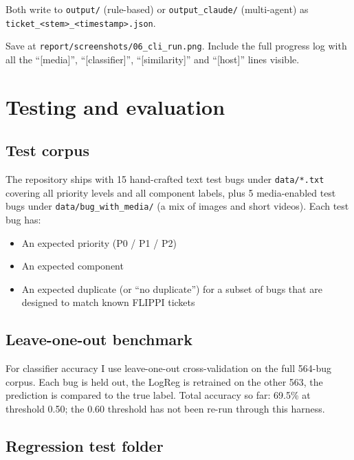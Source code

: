 \documentclass[11pt,a4paper]{article}
\begin{document}
Both write to \texttt{output/} (rule-based) or \texttt{output\_claude/}
(multi-agent) as \texttt{ticket\_<stem>\_<timestamp>.json}.

\begin{screenshotbox}
Save at \texttt{report/screenshots/06\_cli\_run.png}. Include the full
progress log with all the ``[media]'', ``[classifier]'', ``[similarity]''
and ``[host]'' lines visible.
\end{screenshotbox}

\newpage

\section{Testing and evaluation}

\subsection{Test corpus}

The repository ships with 15 hand-crafted text test bugs under
\texttt{data/*.txt} covering all priority levels and all component labels,
plus 5 media-enabled test bugs under \texttt{data/bug\_with\_media/} (a
mix of images and short videos). Each test bug has:

\begin{itemize}[leftmargin=1.4em,nosep]
\item An expected priority (P0 / P1 / P2)
\item An expected component
\item An expected duplicate (or ``no duplicate'') for a subset of bugs
      that are designed to match known FLIPPI tickets
\end{itemize}

\subsection{Leave-one-out benchmark}

For classifier accuracy I use leave-one-out cross-validation on the full
564-bug corpus. Each bug is held out, the LogReg is retrained on the
other 563, the prediction is compared to the true label. Total accuracy
so far: 69.5\% at threshold 0.50; the 0.60 threshold has not been re-run
through this harness.

\subsection{Regression test folder}
\end{document}
